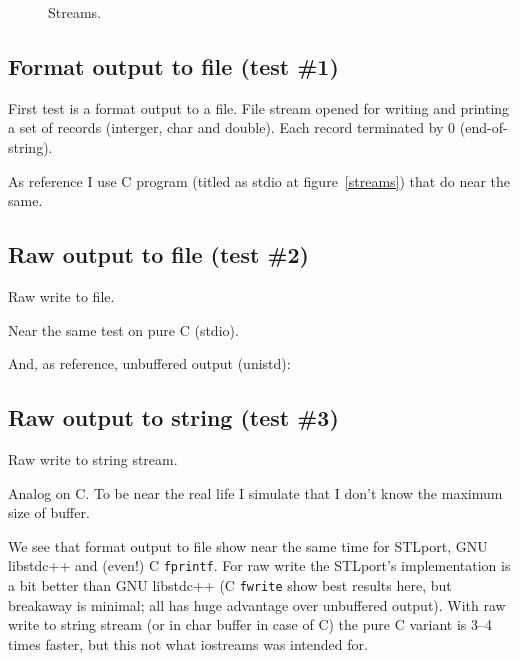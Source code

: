 \documentclass[a4paper]{article}
\providecommand{\STLport}{{\fontfamily{cmss}\selectfont STLport}}
\providecommand{\libstd}{{\fontfamily{cmtt}\selectfont GNU \mbox{libstdc++}}}
\begin{document}
\begin{figure}
  \begin{center}
    
  \end{center}
  \caption{Streams.\label{streamsOne}}
\end{figure}

\subsection{Format output to file\label{fstream-format} (test \#1)}

First test is a format output to a file. File stream opened for writing
and printing a set of records (interger, char and double). Each record
terminated by 0 (end-of-string).



As reference I use C program (titled as stdio at figure~\ref{streams}) that
do near the same.



\subsection{Raw output to file\label{fstream-raw} (test \#2)}

Raw write to file.



Near the same test on pure C (stdio).



And, as reference, unbuffered output (unistd):



\subsection{Raw output to string\label{sstream-raw} (test \#3)}

Raw write to string stream.



Analog on C. To be near the real life I simulate that I don't know
the maximum size of buffer.



We see that format output to file show near the same time
for \STLport{}, \libstd{} and (even!) C \verb|fprintf|. For raw write
the \STLport's implementation is a bit better than \libstd{} (C \verb|fwrite|
show best results here, but breakaway is minimal; all has huge advantage over
unbuffered output). With raw write to string stream
(or in char buffer in case of C) the pure C variant is 3--4 times faster,
but this not what iostreams was intended for.
\end{document}
